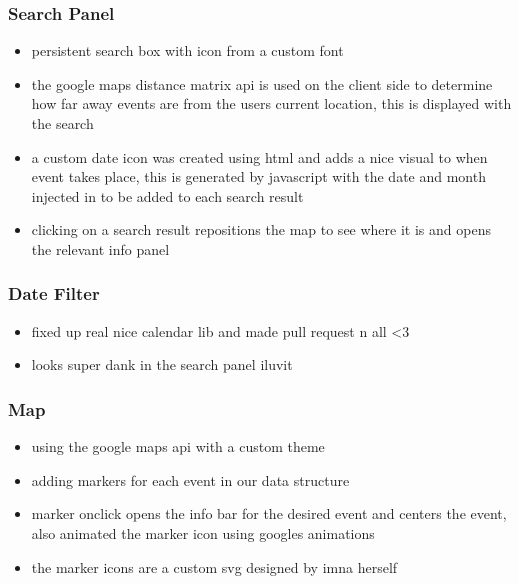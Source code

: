 \documentclass[10pt]{article}
\begin{document}
            \subsubsection{Search Panel}
                \begin{itemize}
                    \item persistent search box with icon from a custom font
                    \item the google maps distance matrix api is used on the client side to determine how far away events are from the users current location, this is displayed with the search
                    \item a custom date icon was created using html and adds a nice visual to when event takes place, this is generated by javascript with the date and month injected in to be added to each search result
                    \item clicking on a search result repositions the map to see where it is and opens the relevant info panel
                \end{itemize}

            \subsubsection{Date Filter}
                \begin{itemize}
                    \item fixed up real nice calendar lib and made pull request n all \textless3
                    \item looks super dank in the search panel iluvit
                \end{itemize}

            \subsubsection{Map}
                \begin{itemize}
                    \item using the google maps api with a custom theme
                    \item adding markers for each event in our data structure
                    \item marker onclick opens the info bar for the desired event and centers the event, also animated the marker icon using googles animations
                    \item the marker icons are a custom svg designed by imna herself
                \end{itemize}
\end{document}
